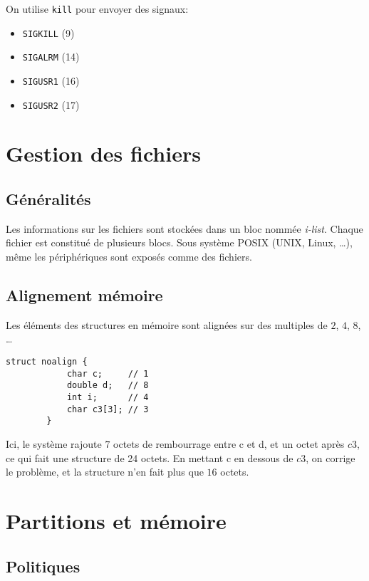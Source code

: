 \documentclass[a4paper]{article}
\begin{document}
\begin{multicols*}{2}
    On utilise \texttt{kill} pour envoyer des signaux:
    \begin{itemize}
        \item \texttt{SIGKILL} (9)
        \item \texttt{SIGALRM} (14)
        \item \texttt{SIGUSR1} (16)
        \item \texttt{SIGUSR2} (17)
    \end{itemize}

    \section{Gestion des fichiers}

    \subsection{Généralités}
    Les informations sur les fichiers sont stockées dans un bloc nommée \emph{i-list}.
    Chaque fichier est constitué de plusieurs blocs.
    Sous système {POSIX} ({UNIX}, Linux, \ldots), même les périphériques sont exposés comme des fichiers.

    \subsection{Alignement mémoire}

    Les éléments des structures en mémoire sont alignées sur des multiples de $2$, $4$, $8$, \ldots
    
    \begin{lstlisting}[frame=shadowbox]
        struct noalign {
            char c;     // 1
            double d;   // 8
            int i;      // 4
            char c3[3]; // 3
        }
    \end{lstlisting}

    Ici, le système rajoute $7$ octets de rembourrage entre c et d, et un octet après $c3$, ce qui fait une structure de 24 octets.
    En mettant c en dessous de $c3$, on corrige le problème, et la structure n'en fait plus que $16$ octets.

    \section{Partitions et mémoire}
    
    \subsection{Politiques}


\end{multicols*}
\end{document}

